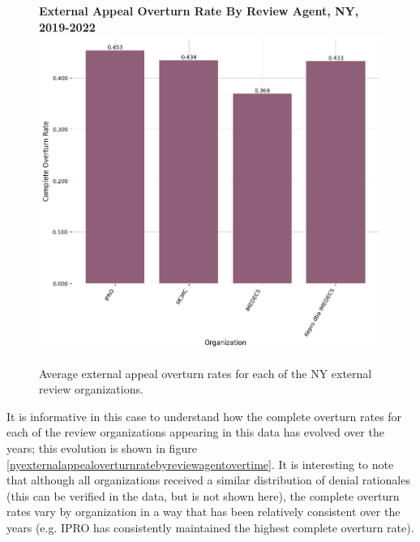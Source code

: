 \documentclass[12pt, a4paper,twoside]{report}
\theoremstyle{plain} %
\theoremstyle{definition} %
\theoremstyle{remark} %
\numberwithin{equation}{chapter}
\begin{document}
		\begin{figure}[h!]
			\centering
			\textbf{External Appeal Overturn Rate By Review Agent, NY, 2019-2022}
			\includegraphics[width=.8\textwidth]{images/nys_external/external_appeal_overturn_rates_by_agent.png}
			\caption{Average external appeal overturn rates for each of the NY external review organizations.}
			\label{nyexternalappealoverturnratebyreviewagent}
		\end{figure}
		
		It is informative in this case to understand how the complete overturn rates for each of the review organizations appearing in this data has evolved over the years; this evolution is shown in figure \ref{nyexternalappealoverturnratebyreviewagentovertime}. It is interesting to note that although all organizations received a similar distribution of denial rationales (this can be verified in the data, but is not shown here), the complete overturn rates vary by organization in a way that has been relatively consistent over the years (e.g. IPRO has consistently maintained the highest complete overturn rate).
		
\end{document}
